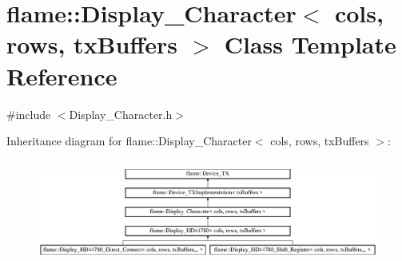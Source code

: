 \hypertarget{classflame_1_1_display___character}{\section{flame\-:\-:Display\-\_\-\-Character$<$ cols, rows, tx\-Buffers $>$ Class Template Reference}
\label{classflame_1_1_display___character}
}


{\ttfamily \#include $<$Display\-\_\-\-Character.\-h$>$}

Inheritance diagram for flame\-:\-:Display\-\_\-\-Character$<$ cols, rows, tx\-Buffers $>$\-:\begin{figure}[H]
\begin{center}
\leavevmode
\includegraphics[height=3.439803cm]{classflame_1_1_display___character}
\end{center}
\end{figure}
